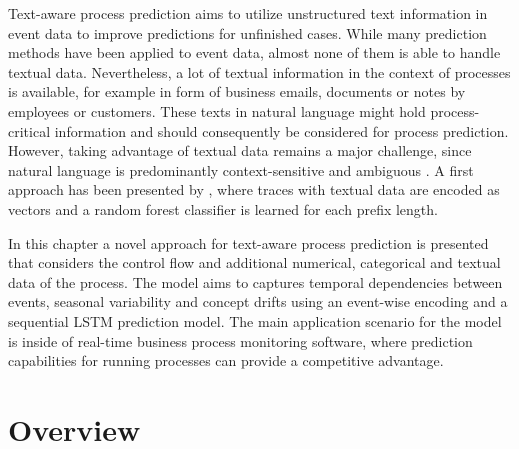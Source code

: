 Text-aware process prediction aims to utilize unstructured text information in event data to improve predictions for unfinished cases.
While many prediction methods have been applied to event data, almost none of them is able to handle textual data.
Nevertheless, a lot of textual information in the context of processes is available, for example in form of business emails, documents or notes by employees or customers.
These texts in natural language might hold process-critical information and should consequently be considered for process prediction.
However, taking advantage of textual data remains a major challenge, since natural language is predominantly context-sensitive and ambiguous  \cite{textminingissues}.
A first approach has been presented by \citeauthor{DBLP:conf/bpm/TeinemaaDMF16}  \cite{DBLP:conf/bpm/TeinemaaDMF16}, where traces with textual data are encoded as vectors and a random forest classifier is learned for each prefix length.

In this chapter a novel approach for text-aware process prediction is presented that considers the control flow and additional numerical, categorical and textual data of the process.
The model aims to captures temporal dependencies between events, seasonal variability and concept drifts using an event-wise encoding and a sequential LSTM prediction model.
The main application scenario for the model is inside of real-time business process monitoring software, where prediction capabilities for running processes can provide a competitive advantage.

\section{Overview}

